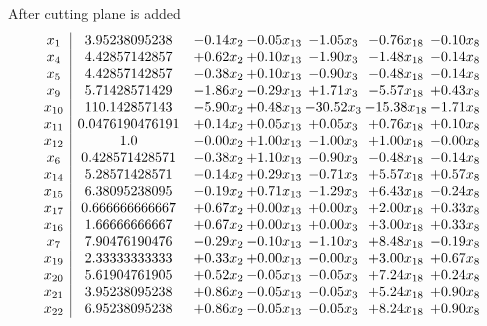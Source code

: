 \documentclass[8pt]{article}
\begin{document}
 After cutting plane is added 
\[\begin{array}{c| c c@{\hskip 2pt} c@{\hskip 2pt} c@{\hskip 2pt} c@{\hskip 2pt} c@{\hskip 2pt} }
 x_{1}   &  3.95238095238 & -0.14 x_{2} & -0.05 x_{13} & -1.05 x_{3} & -0.76 x_{18} & -0.10 x_{8}\\
 x_{4}   &  4.42857142857 & +  0.62 x_{2} & +  0.10 x_{13} & -1.90 x_{3} & -1.48 x_{18} & -0.14 x_{8}\\
 x_{5}   &  4.42857142857 & -0.38 x_{2} & +  0.10 x_{13} & -0.90 x_{3} & -0.48 x_{18} & -0.14 x_{8}\\
 x_{9}   &  5.71428571429 & -1.86 x_{2} & -0.29 x_{13} & +  1.71 x_{3} & -5.57 x_{18} & +  0.43 x_{8}\\
 x_{10}   &  110.142857143 & -5.90 x_{2} & +  0.48 x_{13} & -30.52 x_{3} & -15.38 x_{18} & -1.71 x_{8}\\
 x_{11}   &  0.0476190476191 & +  0.14 x_{2} & +  0.05 x_{13} & +  0.05 x_{3} & +  0.76 x_{18} & +  0.10 x_{8}\\
 x_{12}   &  1.0 & -0.00 x_{2} & +  1.00 x_{13} & -1.00 x_{3} & +  1.00 x_{18} & -0.00 x_{8}\\
 x_{6}   &  0.428571428571 & -0.38 x_{2} & +  1.10 x_{13} & -0.90 x_{3} & -0.48 x_{18} & -0.14 x_{8}\\
 x_{14}   &  5.28571428571 & -0.14 x_{2} & +  0.29 x_{13} & -0.71 x_{3} & +  5.57 x_{18} & +  0.57 x_{8}\\
 x_{15}   &  6.38095238095 & -0.19 x_{2} & +  0.71 x_{13} & -1.29 x_{3} & +  6.43 x_{18} & -0.24 x_{8}\\
 x_{17}   &  0.666666666667 & +  0.67 x_{2} & +  0.00 x_{13} & +  0.00 x_{3} & +  2.00 x_{18} & +  0.33 x_{8}\\
 x_{16}   &  1.66666666667 & +  0.67 x_{2} & +  0.00 x_{13} & +  0.00 x_{3} & +  3.00 x_{18} & +  0.33 x_{8}\\
 x_{7}   &  7.90476190476 & -0.29 x_{2} & -0.10 x_{13} & -1.10 x_{3} & +  8.48 x_{18} & -0.19 x_{8}\\
 x_{19}   &  2.33333333333 & +  0.33 x_{2} & +  0.00 x_{13} & -0.00 x_{3} & +  3.00 x_{18} & +  0.67 x_{8}\\
 x_{20}   &  5.61904761905 & +  0.52 x_{2} & -0.05 x_{13} & -0.05 x_{3} & +  7.24 x_{18} & +  0.24 x_{8}\\
 x_{21}   &  3.95238095238 & +  0.86 x_{2} & -0.05 x_{13} & -0.05 x_{3} & +  5.24 x_{18} & +  0.90 x_{8}\\
 x_{22}   &  6.95238095238 & +  0.86 x_{2} & -0.05 x_{13} & -0.05 x_{3} & +  8.24 x_{18} & +  0.90 x_{8}\\

\end{array}\]
\end{document}

